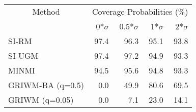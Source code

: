 
\begin{tabular}{lrrrr}
\toprule
\multicolumn{1}{c}{Method} & \multicolumn{4}{c}{Coverage Probabilities (\%)} \\
 & 0*$\sigma$ & 0.5*$\sigma$ & 1*$\sigma$ & 2*$\sigma$\\
\midrule
SI-RM            & 97.4 & 96.3 & 95.1 & 93.8\\
SI-UGM           & 97.4 & 97.2 & 94.9 & 93.3\\
MINMI            & 94.5 & 95.6 & 94.8 & 93.3\\
GRIWM-BA (q=0.5) &  0.0 & 49.9 & 80.6 & 69.5\\
GRIWM (q=0.05)   &  0.0 &  7.1 & 23.0 & 14.1\\
\bottomrule
\end{tabular}
